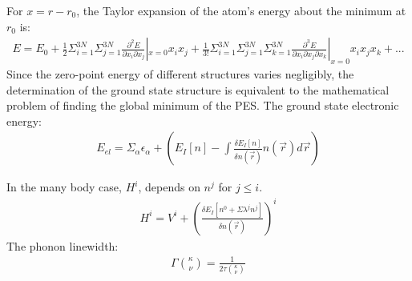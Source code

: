 \documentclass{article}
\numberwithin{equation}{section}
\begin{document}
For $x=r-r_0$, the Taylor expansion of the atom's energy about the minimum at $r_0$ is:
\begin{align*}
	E=E_0+\frac{1}{2}\Sigma_{i=1}^{3N}\Sigma_{j=1}^{3N}\frac{\partial^2E}{\partial x_i\partial x_j}|_{x=0}x_ix_j+\frac{1}{3!}\Sigma_{i=1}^{3N}\Sigma_{j=1}^{3N}\Sigma_{k=1}^{3N}\frac{\partial^3E}{\partial x_i\partial x_j\partial x_k}|_{x=0}x_ix_jx_k+...
\end{align*}
Since the zero-point energy of different structures varies negligibly, the determination of the ground state structure is equivalent to the mathematical problem of ﬁnding the global minimum of the PES. The ground state electronic energy:
\begin{align*}
	E_{el}=\Sigma_\alpha \epsilon_\alpha +\left(E_I[n]-\int\frac{\delta E_I[n]}{\delta n(\vec{r})}n(\vec{r})d\vec{r}\right)
\end{align*}

In the many body case, $H^{i}$, depends on $n^j$ for $j\leq i$. 
\begin{align*}
	H^i=V^i+\left(\frac{\delta E_{I}[n^0+\Sigma\lambda^jn^j]}{\delta n(\vec{r})}\right)^i
\end{align*}
The phonon linewidth:
\begin{align*}
	\Gamma {\kappa \choose \nu}= \frac{1}{2\tau {\kappa \choose \nu}}
\end{align*}
\end{document}
